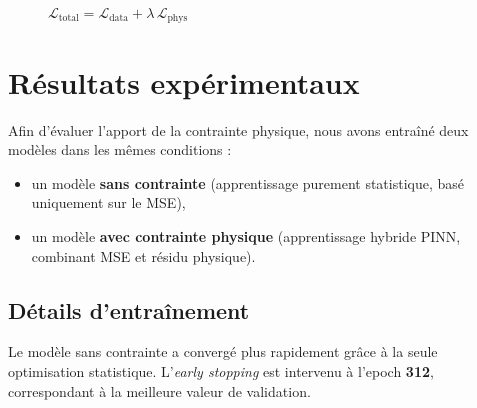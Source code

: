 \documentclass[12pt, a4paper]{report}
\begin{document}
\begin{figure}[H]
    \centering
    \begin{minipage}{0.46\linewidth}
        \centering
    \end{minipage}\hfill
    \begin{minipage}{0.52\linewidth}
        \centering
    \end{minipage}

    \vspace{3mm}

    {\Large $\displaystyle \mathcal{L}_{\text{total}}
      = \mathcal{L}_{\text{data}} + \lambda\,\mathcal{L}_{\text{phys}}$}

\end{figure}

\section{Résultats expérimentaux}

Afin d’évaluer l’apport de la contrainte physique, nous avons entraîné deux modèles dans les mêmes conditions :
\begin{itemize}
    \item un modèle \textbf{sans contrainte} (apprentissage purement statistique, basé uniquement sur le MSE),
    \item un modèle \textbf{avec contrainte physique} (apprentissage hybride PINN, combinant MSE et résidu physique).
\end{itemize}

\subsection*{Détails d’entraînement}

Le modèle sans contrainte a convergé plus rapidement grâce à la seule optimisation statistique. L’\textit{early stopping} est intervenu à l’epoch \textbf{312}, correspondant à la meilleure valeur de validation.  
\end{document}
